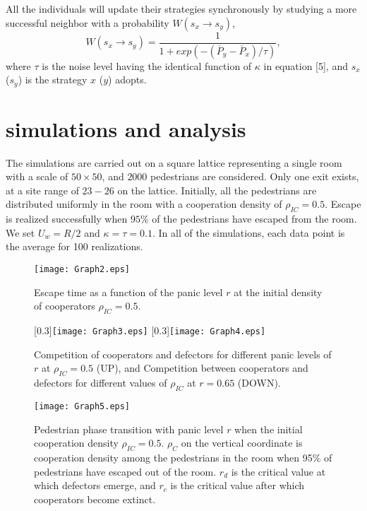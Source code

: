 \documentclass[%
 reprint,
 amsmath,amssymb,
 aps,
]{revtex4-1}
\begin{document}
All the individuals will update their strategies synchronously by studying a more successful neighbor with a probability $W(s_{x}\rightarrow s_{y})$,
\begin{equation}
W(s_{x}\rightarrow s_{y})=\frac{1}{1+exp(-(\overline{P}_{y}-\overline{P}_{x})/\tau)},
\end{equation}
where $\tau$ is the noise level having the identical function of $\kappa$ in equation [5], and $s_{x}$ ($s_{y}$) is the strategy $x$ ($y$) adopts.

\section{\label{sec:level1}simulations and analysis}

The simulations are carried out on a square lattice representing a single room with a scale of $50\times 50$, and $2000$ pedestrians are considered. Only one exit exists, at a site range of $23-26$ on the lattice. Initially, all the pedestrians are distributed uniformly in the room with a cooperation density of $\rho_{IC}=0.5$. Escape is realized successfully when $95\%$ of the pedestrians have escaped from the room. We set $U_{w}=R/2$ and $\kappa=\tau=0.1$. In all of the simulations, each data point is the average for 100 realizations.

\begin{figure}
\centerline{\texttt{[image: Graph2.eps]}}
\caption{Escape time as a function of the panic level $r$ at the initial density of cooperators $\rho_{IC}=0.5$. }\label{afoto}
\end{figure}

\begin{figure}
\begin{center}
\scalebox{0.3}[0.3]{\texttt{[image: Graph3.eps]}}
\quad
\scalebox{0.3}[0.3]{\texttt{[image: Graph4.eps]}}
\caption{ Competition of cooperators and defectors for different panic levels of $r$ at $\rho_{IC}=0.5$ (UP), and Competition between cooperators and defectors for different values of $\rho_{IC}$ at $r = 0.65$ (DOWN).}
\end{center}
\end{figure}


\begin{figure}
\centerline{\texttt{[image: Graph5.eps]}}
\caption{ Pedestrian phase transition with panic level $r$ when the initial cooperation density $\rho_{IC}=0.5$. $\rho_{C}$ on the vertical coordinate is cooperation density among the pedestrians in the room when 95\% of pedestrians have escaped out of the room. $r_{d}$ is the critical value at which defectors emerge, and $r_{c}$ is the critical value after which cooperators become extinct.}\label{afoto}
\end{figure}
\end{document}

